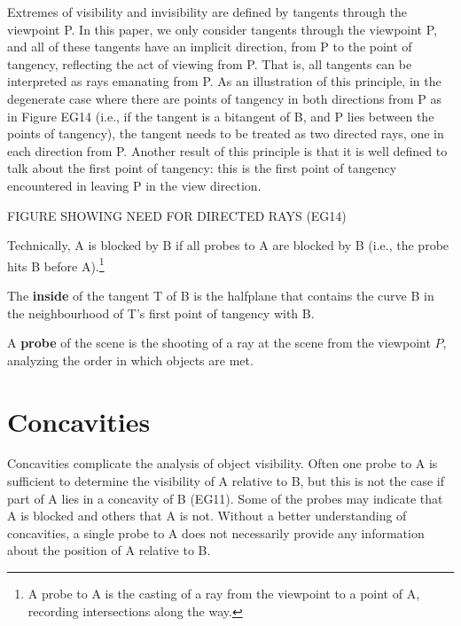 \documentclass[12pt]{article}
\begin{document}
Extremes of visibility and invisibility are defined by tangents through the
viewpoint P.  
In this paper, we only consider tangents through the viewpoint P,
and all of these tangents have an implicit direction, from P to the point of tangency,
reflecting the act of viewing from P.
That is, all tangents can be interpreted as rays emanating from P.
As an illustration of this principle, in the 
degenerate case where there are points of tangency in both directions from P
as in Figure EG14
(i.e., if the tangent is a bitangent of B, and P lies between the points of tangency),
the tangent needs to be treated as two directed rays, one in each direction from P.
Another result of this principle is that it is well defined to talk about
the first point of tangency: this is the first point
of tangency encountered in leaving P in the view direction.

FIGURE SHOWING NEED FOR DIRECTED RAYS (EG14)

Technically, A is blocked by B if all probes to A are blocked by B
(i.e., the probe hits B before A).\footnote{A probe to A is the casting of a ray
  from the viewpoint to a point of A, recording intersections along the way.}

\begin{defn2}
\label{defn:inside}
The {\bf inside} of the tangent T of B
is the halfplane that contains the curve B
in the neighbourhood of T's first point of tangency with B.
\end{defn2}

\begin{defn2}
A {\bf probe} of the scene is the shooting of a ray at the scene from the viewpoint $P$,
analyzing the order in which objects are met.
\end{defn2}


\section{Concavities}

Concavities complicate the analysis of object visibility.
Often one probe to A is sufficient to determine the visibility of A relative to B,
but this is not the case if part of A lies in a concavity of B (EG11).
Some of the probes may indicate that A is blocked and others that A is not.
Without a better understanding of concavities, 
a single probe to A does not necessarily provide any information about the position of A
relative to B.
\end{document}
